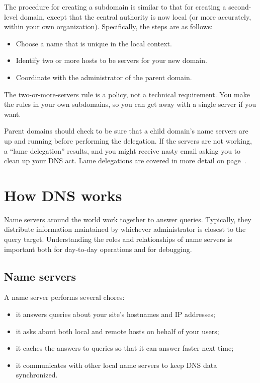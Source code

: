 The procedure for creating a subdomain is similar to that for creating a second-level domain, except that the central authority is now local (or
more accurately, within your own organization). Specifically, the steps are as follows:

\begin{itemize}
\item
  Choose a name that is unique in the local context.
\item
  Identify two or more hosts to be servers for your new domain.
\item
  Coordinate with the administrator of the parent domain.
\end{itemize}

The two-or-more-servers rule is a policy, not a technical requirement.
You make the rules in your own subdomains, so you can get away with a
single server if you want.

Parent domains should check to be sure that a child domain's name
servers are up and running before performing the delegation. If the
servers are not working, a ``lame delegation'' results, and you might
receive nasty email asking you to clean up your DNS act. Lame
delegations are covered in more detail on page~\pageref{sec:lame-delegations}.




\section{How DNS works}

Name servers around the world work together to answer queries.
Typically, they distribute information maintained by whichever
administrator is closest to the {query} target. Understanding the roles
and relationships of name servers is important both for day-to-day
operations and for debugging.

\subsection{Name servers}

A name server performs several chores:

\begin{itemize}
\item it answers queries about your site's hostnames and IP addresses;
\item it asks about both local and remote hosts on behalf of your users;
\item it caches the answers to queries so that it can answer faster next time;
\item it communicates with other local name servers to keep DNS data synchronized.
\end{itemize}

